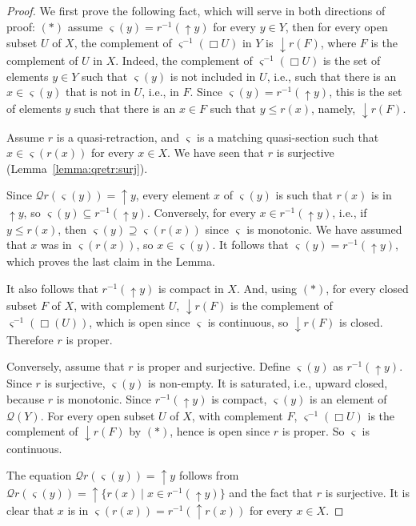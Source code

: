 \documentclass{LMCS}
\newcommand\Smyth{\mathcal Q}
\newcommand\upc{\mathop{\uparrow}\nolimits}
\newcommand\dc{\mathop{\downarrow}\nolimits}
\newcommand\qs{\varsigma}
\begin{document}
\begin{proof}
  We first prove the following fact, which will serve in both
  directions of proof: $(*)$ assume $\qs (y) = r^{-1} (\upc y)$ for
  every $y \in Y$, then for every open subset $U$ of $X$, the
  complement of $\qs^{-1} (\Box U)$ in $Y$ is $\dc r (F)$, where $F$
  is the complement of $U$ in $X$.  Indeed, the complement of
  $\qs^{-1} (\Box U)$ is the set of elements $y \in Y$ such that $\qs
  (y)$ is not included in $U$, i.e., such that there is an $x \in \qs
  (y)$ that is not in $U$, i.e., in $F$.  Since $\qs (y) = r^{-1}
  (\upc y)$, this is the set of elements $y$ such that there is an $x
  \in F$ such that $y \leq r (x)$, namely, $\dc r (F)$.

  Assume $r$ is a quasi-retraction, and $\qs$ is a matching
  quasi-section such that $x \in \qs (r (x))$ for every $x \in X$.  We
  have seen that $r$ is surjective (Lemma~\ref{lemma:qretr:surj}).

  Since $\Smyth r (\qs (y)) = \upc y$, every element $x$ of $\qs (y)$
  is such that $r (x)$ is in $\upc y$, so $\qs (y) \subseteq r^{-1}
  (\upc y)$.  Conversely, for every $x \in r^{-1} (\upc y)$, i.e., if
  $y \leq r (x)$, then $\qs (y) \supseteq \qs (r (x))$ since $\qs$ is
  monotonic.  We have assumed that $x$ was in $\qs (r (x))$, so $x \in
  \qs (y)$.  It follows that $\qs (y) = r^{-1} (\upc y)$, which proves
  the last claim in the Lemma.

  It also follows that $r^{-1} (\upc y)$ is compact in $X$.  And,
  using $(*)$, for every closed subset $F$ of $X$, with complement
  $U$, $\dc r (F)$ is the complement of $\qs^{-1} (\Box (U))$, which
  is open since $\qs$ is continuous, so $\dc r (F)$ is closed.
  Therefore $r$ is proper.

  Conversely, assume that $r$ is proper and surjective.  Define $\qs
  (y)$ as $r^{-1} (\upc y)$.  Since $r$ is surjective, $\qs (y)$ is
  non-empty.  It is saturated, i.e., upward closed, because $r$ is
  monotonic.  Since $r^{-1} (\upc y)$ is compact, $\qs (y)$ is an
  element of $\Smyth (Y)$.  For every open subset $U$ of $X$, with
  complement $F$, $\qs^{-1} (\Box U)$ is the complement of $\dc r (F)$
  by $(*)$, hence is open since $r$ is proper.  So $\qs$ is
  continuous.

  The equation $\Smyth r (\qs (y)) = \upc y$ follows from $\Smyth r
  (\qs (y)) = \upc \{r (x) \mid x \in r^{-1} (\upc y)\}$ and the fact
  that $r$ is surjective.  It is clear that $x$ is in $\qs (r (x)) = r^{-1}
  (\upc r (x))$ for every $x \in X$.
\end{proof}
\end{document}
